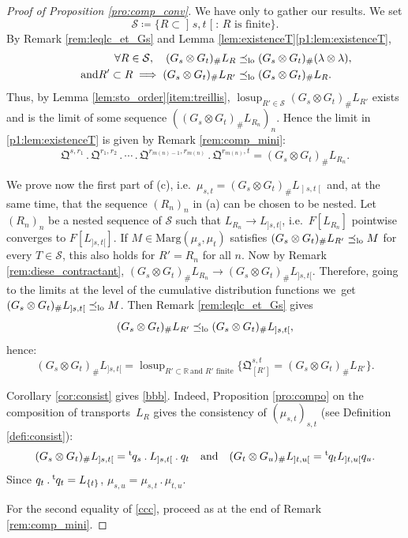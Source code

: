 \documentclass[10pt,a4paper]{article}
\providecommand{\ie}{i.e.\ }
\newcommand{\ldot}{\mathbin{.}}
\newcommand{\lcdots}{\ldot\cdots\ldot}
\theoremstyle{plain}
\theoremstyle{definition}
\newcommand{\como}{\mathfrak{Q}}
\newcommand{\trans}{{}^{\mathrm{t}}\mkern-1mu}
\newcommand{\eqdef}{\coloneqq}
\newcommand{\la}{\lambda}
\newcommand{\ma}{\mathrm{Marg}}
\newcommand{\R}{\mathbb{R}}
\newcommand{\AND}{\quad\text{and}\quad}
\newcommand{\lcsup}{\operatorname{losup}}
\newcommand{\op}{\mathopen}
\newcommand{\clo}{\mathclose}
\newcommand{\leqlc}{\preceq_{\rm lo}}
\begin{document}
\begin{proof}[Proof of Proposition \ref{pro:comp_conv}] We have only to gather our results. We set
\[
\mathcal{S}\eqdef\{R\subset \op]s,t\clo[:\,R\text{ is finite}\}.
\]
By Remark \ref{rem:leqlc_et_Gs} and Lemma \ref{lem:existenceT}\eqref{p1:lem:existenceT},
\begin{align*}
\forall R\in\mathcal{S},\quad (G_s\otimes G_t)_\#L_R&\leqlc (G_s\otimes G_t)_\#(\la\otimes \la),\\
\tag*{and}
R'\subset R\implies(G_s\otimes G_t)_\#L_{R'}&\leqlc (G_s\otimes G_t)_\#L_{R}. 
\end{align*}
Thus, by Lemma \ref{lem:sto_order}\eqref{item:treillis}, $\lcsup_{R'\in\mathcal{S}}(G_s\otimes G_t)_\#L_{R'}$ exists and is the limit of some sequence $((G_s\otimes G_t)_\#L_{R_n})_n$. Hence the limit in \eqref{p1:lem:existenceT} is given by Remark \ref{rem:comp_mini}:
\[\como^{s,r_1}{}\ldot\como^{r_1,r_2}\lcdots \como^{r_{m(n)-1},r_{m(n)}}{}\ldot\como^{r_{m(n)},t}=(G_s\otimes G_t)_\#L_{R_n}.\]

We prove now the first part of (c), \ie $\mu_{s,t}=(G_s\otimes G_t)_\#L_{\op]s,t\clo[}$ and, at the same time, that the sequence $(R_n)_n$ in (a) can be chosen to be nested. Let $(R_n)_n$ be a nested sequence of $\mathcal{S}$ such that $L_{R_n}\to L_{]s,t[}$, \ie $F[L_{R_n}]$ pointwise converges to $F[L_{]s,t[}]$. If $M\in \ma(\mu_s,\mu_t)$ satisfies $(G_s\otimes G_t)_\#L_{R'}\leqlc M$ for every $T\in \mathcal{S}$, this also holds for $R'=R_n$ for all $n$. Now by Remark \ref{rem:diese_contractant}, $(G_s\otimes G_t)_\#L_{R_n}\to (G_s\otimes G_t)_\#L_{]s,t[}$. Therefore, going to the limits at the level of the cumulative distribution functions we~get $(G_s\otimes G_t)_\#L_{]s,t[}\leqlc M$. Then Remark \ref{rem:leqlc_et_Gs} gives
\[
(G_s\otimes G_t)_\#L_{R'}\leqlc(G_s\otimes G_t)_\#L_{]s,t[},
\]
hence:
\[(G_s\otimes G_t)_\#L_{]s,t[}=\lcsup_{R'\subset\R\ \text{and $R'$ finite}}\bigl\{\como^{s,t}_{[R']}=(G_s\otimes G_t)_\#L_{R'}\bigr\}.\]

Corollary \ref{cor:consist} gives \eqref{bbb}. Indeed, Proposition \ref{pro:compo} on the composition of transports~$L_R$ gives the consistency of $(\mu_{s,t})_{s,t}$ (see Definition \ref{defi:consist}):
\[
(G_s\otimes G_t)_\#L_{\op]s,t\clo[}=\trans{q}_s \ldot L_{\op]s,t\clo[}{}\ldot q_t\AND (G_t\otimes G_u)_\#L_{]t,u[}=\trans{q}_t L_{]t,u[}q_u.
\]
Since $q_t\ldot\trans{q}_t=L_{\{t\}}$, $\mu_{s,u}=\mu_{s,t}{}\ldot\mu_{t,u}$.

For the second equality of \eqref{ccc}, proceed as at the end of Remark \ref{rem:comp_mini}.
\end{proof}
\end{document}
